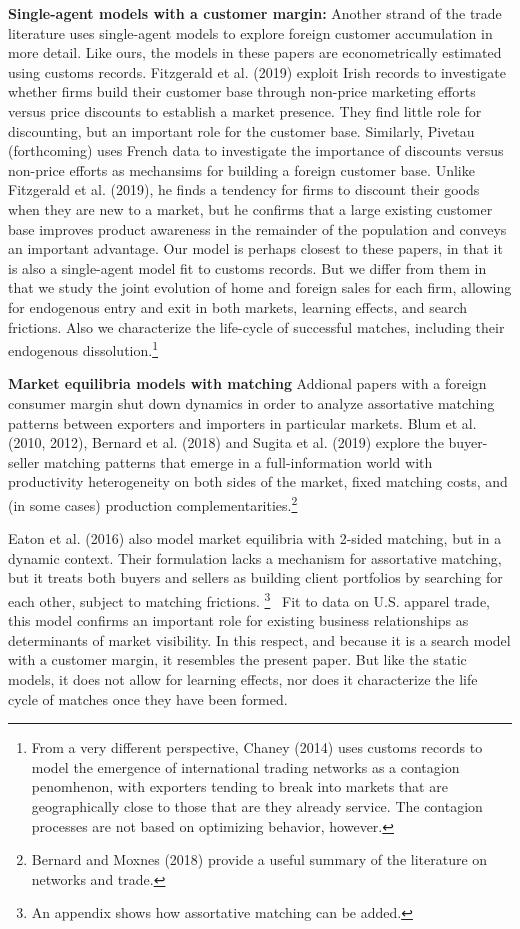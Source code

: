 \documentclass[12pt]{article}
\begin{document}
\textbf{Single-agent models with a customer margin:} Another strand of the
trade literature uses single-agent models to explore foreign customer
accumulation in more detail. Like ours, the models in these papers are
econometrically estimated using customs records. Fitzgerald et al. (2019)
exploit Irish records to investigate whether firms build their customer base
through non-price marketing efforts versus price discounts to establish a
market presence. They find little role for discounting, but an important
role for the customer base. Similarly, Pivetau (forthcoming) uses French
data to investigate the importance of discounts versus non-price efforts as
mechansims for building a foreign customer base. Unlike Fitzgerald et al.
(2019), he finds a tendency for firms to discount their goods when they are
new to a market, but he confirms that a large existing customer base
improves product awareness in the remainder of the population and conveys an
important advantage. Our model is perhaps closest to these papers, in that
it is also a single-agent model fit to customs records. But we differ from
them in that we study the joint evolution of home and foreign sales for each
firm, allowing for endogenous entry and exit in both markets, learning
effects, and search frictions. Also we characterize the life-cycle of
successful matches, including their endogenous dissolution.\footnote{%
From a very different perspective, Chaney (2014) uses customs records to
model the emergence of international trading networks as a contagion
penomhenon, with exporters tending to break into markets that are
geographically close to those that are they already service. The contagion
processes are not based on optimizing behavior, however.}

\textbf{Market equilibria models with matching }Addional papers with a
foreign consumer margin shut down dynamics in order to analyze assortative
matching patterns between exporters and importers in particular markets.
Blum et al. (2010, 2012), Bernard et al. (2018) and Sugita et al. (2019)
explore the buyer-seller matching patterns that emerge in a full-information
world with productivity heterogeneity on both sides of the market, fixed
matching costs, and (in some cases) production complementarities.\footnote{%
Bernard and Moxnes (2018) provide a useful summary of the literature on
networks and trade.}

Eaton et al. (2016) also model market equilibria with 2-sided matching, but
in a dynamic context. Their formulation lacks a mechanism for assortative
matching, but it treats both buyers and sellers as building client
portfolios by searching for each other, subject to matching frictions.%
\footnote{%
An appendix shows how assortative matching can be added.} \ Fit to data on
U.S. apparel trade, this model confirms an important role for existing
business relationships as determinants of market visibility. In this
respect, and because it is a search model with a customer margin, it
resembles the present paper. But like the static models, it does not allow
for learning effects, nor does it characterize the life cycle of matches
once they have been formed.
\end{document}
